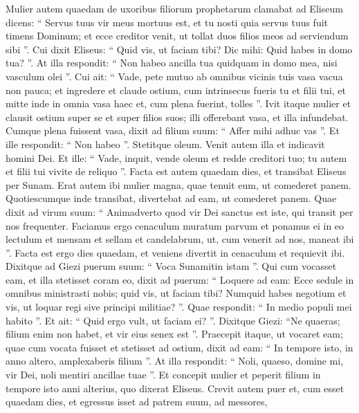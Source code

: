\begin{biblechapter}
\begin{biblechapter}
\begin{biblechapter}
\begin{biblechapter}
 \verse Mulier autem quaedam de uxoribus filiorum prophetarum clamabat ad Eliseum dicens: “ Servus tuus vir meus mortuus est, et tu nosti quia servus tuus fuit timens Dominum; et ecce creditor venit, ut tollat duos filios meos ad serviendum sibi ”. 
\verse Cui dixit Eliseus: “ Quid vis, ut faciam tibi? Dic mihi: Quid habes in domo tua? ”. At illa respondit: “ Non habeo ancilla tua quidquam in domo mea, nisi vasculum olei ”. 
\verse Cui ait: “ Vade, pete mutuo ab omnibus vicinis tuis vasa vacua non pauca; 
\verse et ingredere et claude ostium, cum intrinsecus fueris tu et filii tui, et mitte inde in omnia vasa haec et, cum plena fuerint, tolles ”. 
\verse Ivit itaque mulier et clausit ostium super se et super filios suos; illi offerebant vasa, et illa infundebat. 
\verse Cumque plena fuissent vasa, dixit ad filium suum: “ Affer mihi adhuc vas ”. Et ille respondit: “ Non habeo ”. Stetitque oleum. 
\verse Venit autem illa et indicavit homini Dei. Et ille: “ Vade, inquit, vende oleum et redde creditori tuo; tu autem et filii tui vivite de reliquo ”.
 \verse Facta est autem quaedam dies, et transibat Eliseus per Sunam. Erat autem ibi mulier magna, quae tenuit eum, ut comederet panem. Quotiescumque inde transibat, divertebat ad eam, ut comederet panem. 
\verse Quae dixit ad virum suum: “ Animadverto quod vir Dei sanctus est iste, qui transit per nos frequenter. 
 \verse Faciamus ergo cenaculum muratum parvum et ponamus ei in eo lectulum et mensam et sellam et candelabrum, ut, cum venerit ad nos, maneat ibi ”.
 \verse Facta est ergo dies quaedam, et veniens divertit in cenaculum et requievit ibi. 
\verse Dixitque ad Giezi puerum suum: “ Voca Sunamitin istam ”. Qui cum vocasset eam, et illa stetisset coram eo, 
\verse dixit ad puerum: “ Loquere ad eam: Ecce sedule in omnibus ministrasti nobis; quid vis, ut faciam tibi? Numquid habes negotium et vis, ut loquar regi sive principi militiae? ”. Quae respondit: “ In medio populi mei habito ”. 
\verse Et ait: “ Quid ergo vult, ut faciam ei? ”. Dixitque Giezi: “Ne quaeras; filium enim non habet, et vir eius senex est ”.
 \verse Praecepit itaque, ut vocaret eam; quae cum vocata fuisset et stetisset ad ostium, 
\verse dixit ad eam: “ In tempore isto, in anno altero, amplexaberis filium ”. At illa respondit: “ Noli, quaeso, domine mi, vir Dei, noli mentiri ancillae tuae ”. 
\verse Et concepit mulier et peperit filium in tempore isto anni alterius, quo dixerat Eliseus.
 \verse Crevit autem puer et, cum esset quaedam dies, et egressus isset ad patrem suum, ad messores, 

\end{biblechapter}
\end{biblechapter}
\end{biblechapter}
\end{biblechapter}
